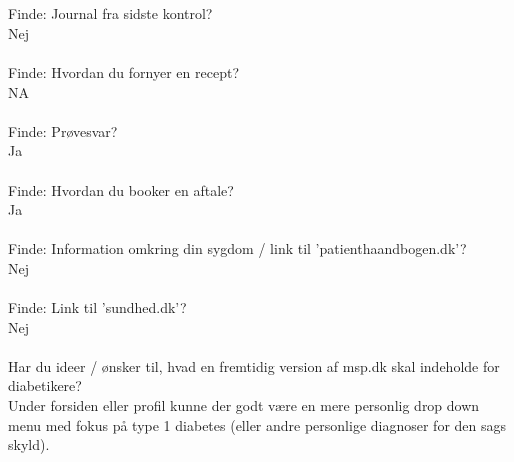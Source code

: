 \documentclass[english]{article}
\begin{document}
\\ \\
Finde: Journal fra sidste kontrol?\\
Nej
\\ \\
Finde: Hvordan du fornyer en recept?\\
NA
\\ \\
Finde: Prøvesvar?\\
Ja
\\ \\
Finde: Hvordan du booker en aftale?\\
Ja
\\ \\
Finde: Information omkring din sygdom / link til ’patienthaandbogen.dk’?\\
Nej
\\ \\
Finde: Link til ’sundhed.dk’?\\
Nej
\\ \\
Har du ideer / ønsker til, hvad en fremtidig version af msp.dk skal indeholde for diabetikere?\\
Under forsiden eller profil kunne der godt være en mere personlig drop down menu med fokus på type 1 diabetes (eller andre personlige diagnoser for den sags skyld). 
\end{document}
